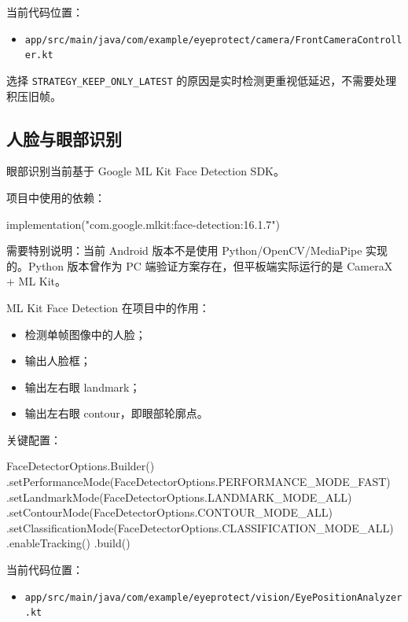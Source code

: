 \documentclass[UTF8,a4paper,11pt]{ctexart}
\begin{document}
当前代码位置：

\begin{itemize}
  \item \texttt{app/src/main/java/com/example/eyeprotect/camera/FrontCameraController.kt}
\end{itemize}

选择 \texttt{STRATEGY\_KEEP\_ONLY\_LATEST} 的原因是实时检测更重视低延迟，不需要处理积压旧帧。

\subsection{人脸与眼部识别}

眼部识别当前基于 Google ML Kit Face Detection SDK。

项目中使用的依赖：

\begin{code}
implementation("com.google.mlkit:face-detection:16.1.7")
\end{code}

需要特别说明：当前 Android 版本不是使用 Python/OpenCV/MediaPipe 实现的。Python 版本曾作为 PC 端验证方案存在，但平板端实际运行的是 CameraX + ML Kit。

ML Kit Face Detection 在项目中的作用：

\begin{itemize}
  \item 检测单帧图像中的人脸；
  \item 输出人脸框；
  \item 输出左右眼 landmark；
  \item 输出左右眼 contour，即眼部轮廓点。
\end{itemize}

关键配置：

\begin{code}
FaceDetectorOptions.Builder()
  .setPerformanceMode(FaceDetectorOptions.PERFORMANCE_MODE_FAST)
  .setLandmarkMode(FaceDetectorOptions.LANDMARK_MODE_ALL)
  .setContourMode(FaceDetectorOptions.CONTOUR_MODE_ALL)
  .setClassificationMode(FaceDetectorOptions.CLASSIFICATION_MODE_ALL)
  .enableTracking()
  .build()
\end{code}

当前代码位置：

\begin{itemize}
  \item \texttt{app/src/main/java/com/example/eyeprotect/vision/EyePositionAnalyzer.kt}
\end{itemize}
\end{document}
